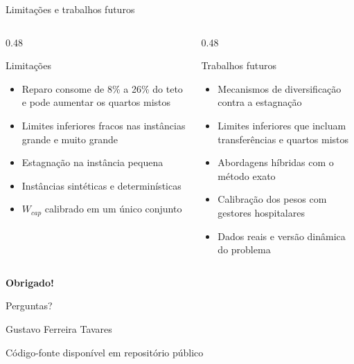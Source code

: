 \documentclass[aspectratio=169,10pt]{beamer}
\newcommand{\framerefs}{}
\newcommand{\slidecites}[1]{\gdef\framerefs{Referências: \cite{#1}}}
\gdef\framerefs{}%
\begin{document}
\begin{frame}{Limitações e trabalhos futuros}
    \slidecites{schafer2023combining, ceschia2012modeling, talbi2009metaheuristics, belien2007building}
    \begin{columns}[t]
        \begin{column}{0.48\textwidth}
            \begin{block}{Limitações}
                \begin{itemize}\setlength{\itemsep}{4pt}
                    \item Reparo consome de 8\% a 26\% do teto e pode aumentar os quartos mistos
                    \item Limites inferiores fracos nas instâncias grande e muito grande
                    \item Estagnação na instância pequena
                    \item Instâncias sintéticas e determinísticas
                    \item $W_{cap}$ calibrado em um único conjunto
                \end{itemize}
            \end{block}
        \end{column}
        \begin{column}{0.48\textwidth}
            \begin{block}{Trabalhos futuros}
                \begin{itemize}\setlength{\itemsep}{4pt}
                    \item Mecanismos de diversificação contra a estagnação
                    \item Limites inferiores que incluam transferências e quartos mistos
                    \item Abordagens híbridas com o método exato
                    \item Calibração dos pesos com gestores hospitalares
                    \item Dados reais e versão dinâmica do problema
                \end{itemize}
            \end{block}
        \end{column}
    \end{columns}
\end{frame}

\begin{frame}[plain]
    \centering
    {\Huge\bfseries Obrigado!\par}

    \vspace{0.6cm}
    {\Large Perguntas?\par}

    \vspace{1.2cm}
    {\small Gustavo Ferreira Tavares\par}

    \vspace{0.3cm}
    {\footnotesize Código-fonte disponível em repositório público \cite{tavares2026repositorio}\par}
\end{frame}
\end{document}
